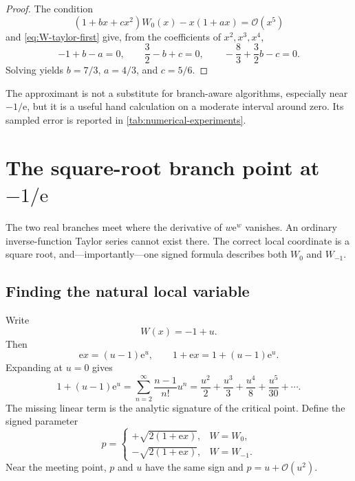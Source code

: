 \documentclass[11pt]{article}
\numberwithin{equation}{section}
\theoremstyle{definition}
\theoremstyle{remark}
\newcommand{\e}{\mathrm e}
\begin{document}
\begin{proof}
The condition
\[
 (1+bx+cx^2)W_0(x)-x(1+ax)=\mathcal O(x^5)
\]
and \eqref{eq:W-taylor-first} give, from the coefficients of
$x^2,x^3,x^4$,
\[
 -1+b-a=0,
 \qquad
 \frac32-b+c=0,
 \qquad
 -\frac83+\frac32b-c=0.
\]
Solving yields $b=7/3$, $a=4/3$, and $c=5/6$.
\end{proof}

The approximant is not a substitute for branch-aware algorithms, especially
near $-1/\e$, but it is a useful hand calculation on a moderate interval
around zero.  Its sampled error is reported in
\cref{tab:numerical-experiments}.

\section{The square-root branch point at \texorpdfstring{$-1/\e$}{-1/e}}
\label{sec:branch-point}

The two real branches meet where the derivative of $w\e^w$ vanishes.  An
ordinary inverse-function Taylor series cannot exist there.  The correct local
coordinate is a square root, and---importantly---one signed formula describes
both $W_0$ and $W_{-1}$.

\subsection{Finding the natural local variable}

Write
\begin{equation}
  W(x)=-1+u.                                           \label{eq:w-minus-one-u}
\end{equation}
Then
\begin{equation}
  \e x=(u-1)\e^u,
  \qquad
  1+\e x=1+(u-1)\e^u.                                 \label{eq:eta-u}
\end{equation}
Expanding at $u=0$ gives
\begin{equation}
  1+(u-1)\e^u
   =\sum_{n=2}^{\infty}\frac{n-1}{n!}u^n
   =\frac{u^2}{2}+\frac{u^3}{3}+\frac{u^4}{8}
      +\frac{u^5}{30}+\cdots.                         \label{eq:eta-u-series}
\end{equation}
The missing linear term is the analytic signature of the critical point.
Define the signed parameter
\begin{equation}
 p=\begin{cases}
  +\sqrt{2(1+\e x)},& W=W_0,\\[1ex]
  -\sqrt{2(1+\e x)},& W=W_{-1}.
 \end{cases}                                           \label{eq:signed-p}
\end{equation}
Near the meeting point, $p$ and $u$ have the same sign and $p=u+\mathcal
O(u^2)$.
\end{document}
